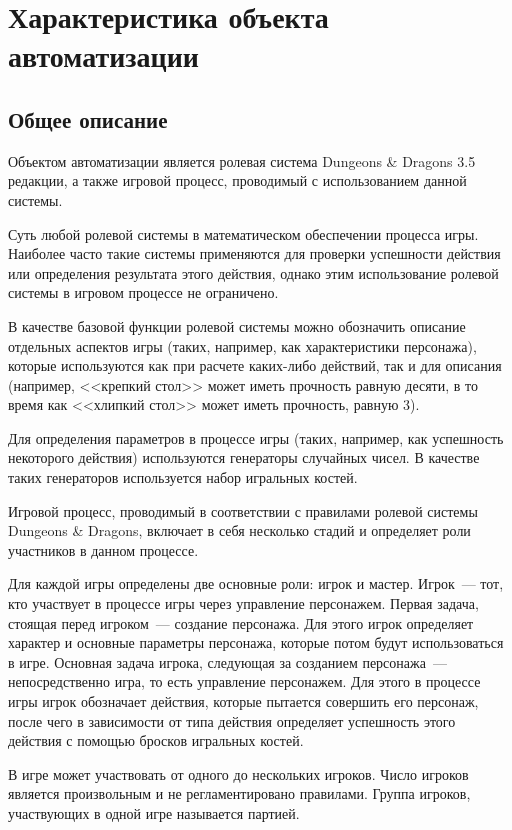 \section{Характеристика объекта автоматизации}
\subsection{Общее описание}
Объектом автоматизации является ролевая система Dungeons \& Dragons 3.5 редакции, а также игровой процесс, проводимый с использованием данной системы.

Суть любой ролевой системы в математическом обеспечении процесса игры. Наиболее часто такие системы применяются для проверки успешности действия или определения результата этого действия, однако этим использование ролевой системы в игровом процессе не ограничено. 

В качестве базовой функции ролевой системы можно обозначить описание отдельных аспектов игры (таких, например, как характеристики персонажа), которые используются как при расчете каких-либо действий, так и для описания (например, <<крепкий стол>> может иметь прочность равную десяти, в то время как <<хлипкий стол>> может иметь прочность, равную 3).

Для определения параметров в процессе игры (таких, например, как успешность некоторого действия) используются генераторы случайных чисел. В качестве таких генераторов используется набор игральных костей.

Игровой процесс, проводимый в соответствии с правилами ролевой системы Dungeons \& Dragons, включает в себя несколько стадий и определяет роли участников в данном процессе.

Для каждой игры определены две основные роли: игрок и мастер. Игрок~--- тот, кто участвует в процессе игры через управление персонажем. Первая задача, стоящая перед игроком~--- создание персонажа. Для этого игрок определяет характер и основные параметры персонажа, которые потом будут использоваться в игре. Основная задача игрока, следующая за созданием персонажа~--- непосредственно игра, то есть управление персонажем. Для этого в процессе игры игрок обозначает действия, которые пытается совершить его персонаж, после чего в зависимости от типа действия определяет успешность этого действия с помощью бросков игральных костей.

В игре может участвовать от одного до нескольких игроков. Число игроков является произвольным и не регламентировано правилами. Группа игроков, участвующих в одной игре называется партией.

